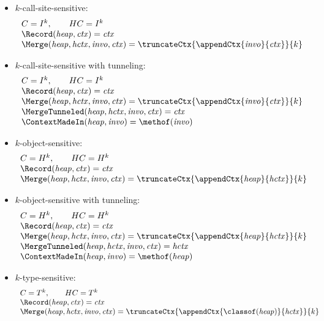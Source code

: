 {\begin{itemize}

\item $k$-call-site-sensitive:
\[
\begin{array}{l}
C = I^k, \qquad HC = I^{k}\\
\Record ({\it heap}, {\it ctx}) =  {\it ctx}\\
\Merge ({\it heap, hctx, invo, ctx}) = \truncateCtx{\appendCtx{{\it invo}}{{\it ctx}}}{k} \\
\end{array}
\]

\item $k$-call-site-sensitive with tunneling:
\[
\begin{array}{l}
C = I^k, \qquad HC = I^{k}\\
\Record ({\it heap}, {\it ctx}) =  {\it ctx}\\
\Merge ({\it heap, hctx, invo, ctx}) = \truncateCtx{\appendCtx{{\it invo}}{{\it ctx}}}{k} \\
\MergeTunneled ({\it heap, hctx, invo, ctx}) = {\it ctx} \\
\ContextMadeIn ({\it heap}, {\it invo}) = \methof({\it invo})
\end{array}
\]


\item $k$-object-sensitive:
\[
\begin{array}{l}
C = H^k, \qquad HC = H^{k}\\
\Record ({\it heap}, {\it ctx}) =  {\it ctx}\\
\Merge ({\it heap, hctx, invo, ctx}) = \truncateCtx{\appendCtx{{\it heap}}{{\it hctx}}}{k} \\
\end{array}
\]
\item $k$-object-sensitive with tunneling:
\[
\begin{array}{l}
C = H^k, \qquad HC = H^{k}\\
\Record ({\it heap}, {\it ctx}) =  {{\it ctx}}\\
\Merge ({\it heap, hctx, invo, ctx}) = \truncateCtx{\appendCtx{{\it heap}}{{\it hctx}}}{k} \\
\MergeTunneled ({\it heap, hctx, invo, ctx}) = {\it hctx} \\
\ContextMadeIn ({\it heap}, {\it invo}) = \methof({\it heap})
\end{array}
\]

\item $k$-type-sensitive:
\[
\begin{array}{l}
C = T^k, \qquad HC = T^k \\
\Record ({\it heap}, {\it ctx}) = {\it ctx}\\
\Merge ({\it heap, hctx, invo, ctx}) = \truncateCtx{\appendCtx{\classof({\it heap})}{{\it hctx}}}{k} \\
\end{array}
\]


\end{itemize}}
